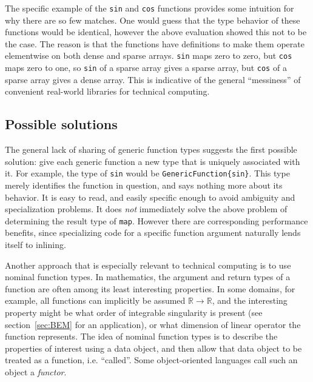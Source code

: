 The specific example of the \texttt{sin} and \texttt{cos} functions provides
some intuition for why there are so few matches.
One would guess that the type behavior of these functions would be identical,
however the above evaluation showed this not to be the case.
The reason is that the functions have definitions to make them operate
elementwise on both dense and sparse arrays.
\texttt{sin} maps zero to zero, but \texttt{cos} maps zero to one,
so \texttt{sin} of a sparse array gives a sparse array, but
\texttt{cos} of a sparse array gives a dense array.
This is indicative of the general ``messiness'' of convenient real-world
libraries for technical computing.


\subsection{Possible solutions}

The general lack of sharing of generic function types suggests the first
possible solution: give each generic function a new type that is uniquely
associated with it. For example, the type of \texttt{sin} would be
\texttt{GenericFunction\{sin\}}. This type merely identifies the function
in question, and says nothing more about its behavior. It is easy to read,
and easily specific enough to avoid ambiguity and specialization
problems. It does \emph{not} immediately solve the above problem of
determining the result type of \texttt{map}. However there are
corresponding performance benefits, since specializing code for a
specific function argument naturally lends itself to inlining.


Another approach that is especially relevant to technical computing is to use
nominal function types.
In mathematics, the argument and return types of a function are often among its
least interesting properties.
In some domains, for example, all functions can implicitly be assumed
$\mathbb{R}\rightarrow\mathbb{R}$, and the interesting property might be
what order of integrable singularity is present (see section~\ref{sec:BEM} for
an application), or what dimension of linear operator the function represents.
The idea of nominal function types is to describe the properties of interest
using a data object, and then allow that data object to be treated as a
function, i.e. ``called''. Some object-oriented languages call such an object
a \emph{functor}.

